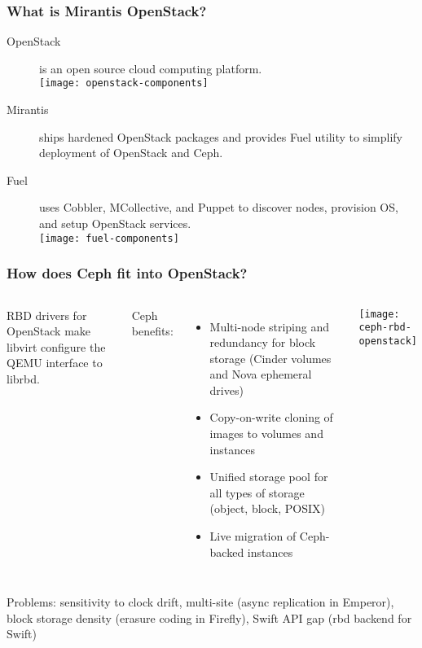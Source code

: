 \documentclass[hyperref=unicode,utf8,xcolor=pst]{beamer}
\begin{document}
\begin{frame}
	\frametitle{What is Mirantis OpenStack?}
	\begin{description}
		\item[OpenStack] is an open source cloud computing
			platform.\\
			\vspace{0.5ex}
			\texttt{[image: openstack-components]}
		\item[Mirantis] ships hardened OpenStack packages and
			provides Fuel utility to simplify deployment of
			OpenStack and Ceph.
		\item[Fuel] uses Cobbler, MCollective, and Puppet to
			discover nodes, provision OS, and setup
			OpenStack services.\\
			\vspace{0.5ex}
			\texttt{[image: fuel-components]}
	\end{description}
\end{frame}

\begin{frame}
	\frametitle{How does Ceph fit into OpenStack?}
	\begin{columns}
		RBD drivers for OpenStack make libvirt configure the
		QEMU interface to librbd.

		\vspace{2ex}
		Ceph benefits:
		\begin{itemize}
			\item Multi-node striping and redundancy for
				block storage (Cinder volumes and Nova
				ephemeral drives)
			\item Copy-on-write cloning of images to
				volumes and instances
			\item Unified storage pool for all types of
				storage (object, block, POSIX)
			\item Live migration of Ceph-backed instances
		\end{itemize}

		\texttt{[image: ceph-rbd-openstack]}
	\end{columns}

	\vspace{2ex}
	Problems: sensitivity to clock drift, multi-site (async
	replication in Emperor), block storage density (erasure coding
	in Firefly), Swift API gap (rbd backend for Swift)
\end{frame}
\end{document}
